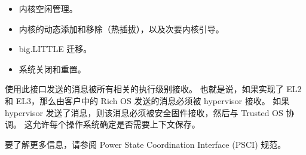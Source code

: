 \begin{itemize}
\item
  内核空闲管理。
\item
  内核的动态添加和移除（热插拔），以及次要内核引导。
\item
  big.LITTLE 迁移。
\item
  系统关闭和重置。
\end{itemize}

使用此接口发送的消息被所有相关的执行级别接收。
也就是说，如果实现了 EL2 和 EL3，那么由客户中的 Rich OS 发送的消息必须被 hypervisor 接收。
如果 hypervisor 发送了消息，则该消息必须被安全固件接收，然后与 Trusted OS 协调。
这允许每个操作系统确定是否需要上下文保存。

要了解更多信息，请参阅 Power State Coordination Interface (PSCI) 规范。


